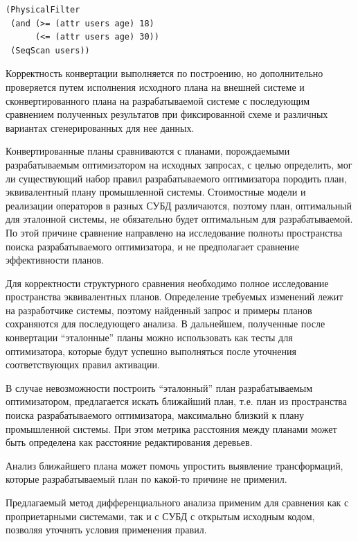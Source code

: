 \documentclass[14pt, russian]{scrartcl}
\begin{document}
\begin{listing}[H]
  \caption{Пример сериализованного плана.}
  \label{lst:serialized-plan}
  \begin{verbatim}
(PhysicalFilter
 (and (>= (attr users age) 18)
      (<= (attr users age) 30))
 (SeqScan users))
  \end{verbatim}
\end{listing}

Корректность конвертации выполняется по построению, но дополнительно проверяется
путем исполнения исходного плана на внешней системе и сконвертированного плана
на разрабатываемой системе с последующим сравнением полученных результатов при
фиксированной схеме и различных вариантах сгенерированных для нее данных.

Конвертированные планы сравниваются с планами, порождаемыми разрабатываемым
оптимизатором на исходных запросах, с целью определить, мог ли существующий
набор правил разрабатываемого оптимизатора породить план, эквивалентный плану
промышленной системы. Стоимостные модели и реализации операторов в разных СУБД
различаются, поэтому план, оптимальный для эталонной системы, не обязательно
будет оптимальным для разрабатываемой. По этой причине сравнение направлено на
исследование полноты пространства поиска разрабатываемого оптимизатора, и не
предполагает сравнение эффективности планов.

Для корректности структурного сравнения необходимо полное исследование
пространства эквивалентных планов. Определение требуемых изменений лежит на
разработчике системы, поэтому найденный запрос и примеры планов сохраняются для
последующего анализа. В дальнейшем, полученные после конвертации ``эталонные''
планы можно использовать как тесты для оптимизатора, которые будут успешно
выполняться после уточнения соответствующих правил активации.

В случае невозможности построить ``эталонный'' план разрабатываемым
оптимизатором, предлагается искать ближайший план, т.е. план из пространства
поиска разрабатываемого оптимизатора, максимально близкий к плану промышленной
системы. При этом метрика расстояния между планами может быть определена как
расстояние редактирования деревьев.

Анализ ближайшего плана может помочь упростить выявление трансформаций, которые
разрабатываемый план по какой-то причине не применил.

Предлагаемый метод дифференциального анализа применим для сравнения как с
проприетарными системами, так и с СУБД с открытым исходным кодом, позволяя
уточнять условия применения правил.
\end{document}
